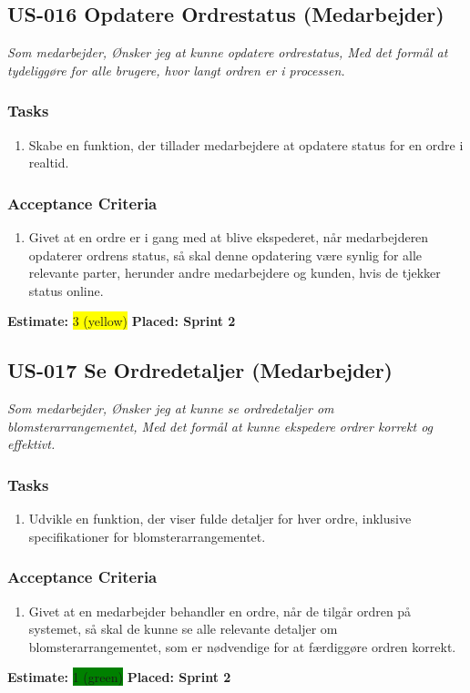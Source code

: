 \subsection{US-016 Opdatere Ordrestatus (Medarbejder)}
\label{sec:US-016}
\textit{Som medarbejder, Ønsker jeg at kunne opdatere ordrestatus, Med det formål at tydeliggøre for alle brugere, hvor langt ordren er i processen.}
\subsubsection*{\textbf{Tasks}}
\begin{enumerate}
  \item Skabe en funktion, der tillader medarbejdere at opdatere status for en ordre i realtid.
\end{enumerate}
\subsubsection*{\textbf{Acceptance Criteria}}
\begin{enumerate}
  \item Givet at en ordre er i gang med at blive ekspederet, når medarbejderen opdaterer ordrens status, så skal denne opdatering være synlig for alle relevante parter, herunder andre medarbejdere og kunden, hvis de tjekker status online.
\end{enumerate}
\textbf{Estimate:} \colorbox{yellow}{3 (yellow)}
\textbf{Placed: Sprint 2}
\par\noindent\dotfill

\subsection{US-017 Se Ordredetaljer (Medarbejder)}
\label{sec:US-017}
\textit{Som medarbejder, Ønsker jeg at kunne se ordredetaljer om blomsterarrangementet, Med det formål at kunne ekspedere ordrer korrekt og effektivt.}
\subsubsection*{\textbf{Tasks}}
\begin{enumerate}
  \item Udvikle en funktion, der viser fulde detaljer for hver ordre, inklusive specifikationer for blomsterarrangementet.
\end{enumerate}
\subsubsection*{\textbf{Acceptance Criteria}}
\begin{enumerate}
  \item Givet at en medarbejder behandler en ordre, når de tilgår ordren på systemet, så skal de kunne se alle relevante detaljer om blomsterarrangementet, som er nødvendige for at færdiggøre ordren korrekt.
\end{enumerate}
\textbf{Estimate:} \colorbox{green}{1 (green)}
\textbf{Placed: Sprint 2}
\par\noindent\dotfill

